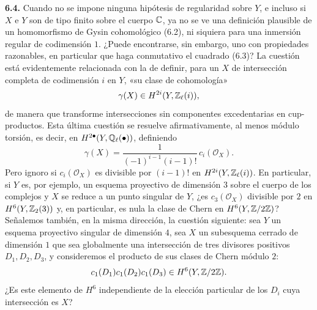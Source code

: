 \textbf{6.4.} Cuando no se impone ninguna hipótesis de regularidad sobre $Y$,
e incluso si $X$ e $Y$ son de tipo finito sobre el cuerpo $\mathbb C$, ya no se ve
una definición plausible de un homomorfismo de Gysin cohomológico (6.2), ni
siquiera para una inmersión regular de codimensión $1$. ¿Puede encontrarse,
sin embargo, uno con propiedades razonables, en particular que haga
conmutativo el cuadrado (6.3)? La cuestión está evidentemente relacionada
con la de definir, para un $X$ de intersección completa de codimensión $i$
en $Y$, «su clase de cohomología»
\[
\gamma(X)\in H^{2i}(Y,\mathbb Z_\ell(i)),
\]
de manera que transforme intersecciones sin componentes excedentarias en
cup-productos. Esta última cuestión se resuelve afirmativamente, al menos
módulo torsión, es decir, en $H^{2\bullet}(Y,\mathbb Q_\ell(\bullet))$, definiendo
\[
\gamma(X)=\frac{1}{(-1)^{i-1}(i-1)!}\,c_i(\mathcal O_X).
\]
Pero ignoro si $c_i(\mathcal O_X)$ es divisible por $(i-1)!$ en
$H^{2i}(Y,\mathbb Z_\ell(i))$. En particular, si $Y$ es, por ejemplo, un esquema
proyectivo de dimensión $3$ sobre el cuerpo de los complejos y $X$ se reduce
a un punto singular de $Y$, ¿es $c_3(\mathcal O_X)$ divisible por $2$ en
$H^6(Y,\mathbb Z_2(3))$ y, en particular, es nula la clase de Chern en
$H^6(Y,\mathbb Z/2\mathbb Z)$? Señalemos también, en la misma dirección, la cuestión
siguiente: sea $Y$ un esquema proyectivo singular de dimensión $4$, sea $X$
un subesquema cerrado de dimensión $1$ que sea globalmente una intersección
de tres divisores positivos $D_1,D_2,D_3$, y consideremos el producto de sus
clases de Chern módulo $2$:
\[
c_1(D_1)c_1(D_2)c_1(D_3)\in H^6(Y,\mathbb Z/2\mathbb Z).
\]
¿Es este elemento de $H^6$ independiente de la elección particular de los
$D_i$ cuya intersección es $X$?
